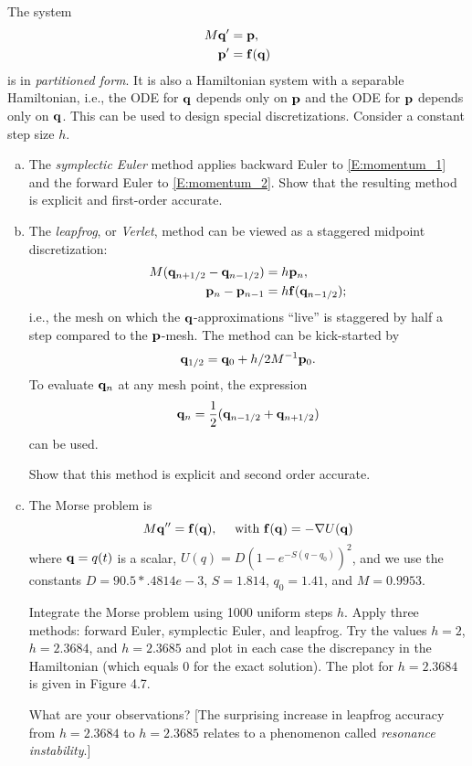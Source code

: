 \begin{problem}[A\&P 4.11]
  The system
  \begin{subequations}
    \begin{align}
      \label{E:momentum_1}
      M \mathbf{q}' &= \mathbf{p}, \\
      \label{E:momentum_2}
      \mathbf{p}' &= \mathbf{f}(\mathbf{q})
    \end{align}
  \end{subequations}
  is in \emph{partitioned form}. It is also a Hamiltonian system with a separable Hamiltonian, i.e., the ODE for $\mathbf{q}$ depends only on $\mathbf{p}$ and the ODE for $\mathbf{p}$ depends only on $\mathbf{q}$. This can be used to design special discretizations. Consider a constant step size $h$.
  \begin{enumerate}[(a)]
    \item The \emph{symplectic Euler} method applies backward Euler to \eqref{E:momentum_1} and the forward Euler to \eqref{E:momentum_2}. Show that the resulting method is explicit and first-order accurate.
    \item The \emph{leapfrog}, or \emph{Verlet}, method can be viewed as a staggered midpoint discretization:
    \begin{align*}
      M(\mathbf{q}_{n+1/2} - \mathbf{q}_{n-1/2}) &= h \mathbf{p}_n, \\
      \mathbf{p}_n - \mathbf{p}_{n-1} &= h \mathbf{f}(\mathbf{q}_{n-1/2});
    \end{align*}
    i.e., the mesh on which the $\mathbf{q}$-approximations ``live'' is staggered by half a step compared to the $\mathbf{p}$-mesh. The method can be kick-started by
    \[
      \mathbf{q}_{1/2} = \mathbf{q}_0 + h/2 M^{-1}\mathbf{p}_0.
    \]
    To evaluate $\mathbf{q}_n$ at any mesh point, the expression
    \[
      \mathbf{q}_n = \frac12 (\mathbf{q}_{n-1/2} + \mathbf{q}_{n+1/2})
    \]
    can be used.
    
    Show that this method is explicit and second order accurate.
    \item The Morse problem is 
    \[
      M \mathbf{q}'' = \mathbf{f}(\mathbf{q}), \quad \text{ with } \mathbf{f}(\mathbf{q}) = -\mathbf{\nabla} U(\mathbf{q})
    \]
    where $\mathbf{q} = q(t)$ is a scalar, $U(q) = D(1 - e^{-S(q-q_0)})^2$, and we use the constants $D = 90.5*.4814e-3$, $S = 1.814$, $q_0 = 1.41$, and $M = 0.9953$.
    
    Integrate the Morse problem using 1000 uniform steps $h$. Apply three methods: forward Euler, symplectic Euler, and leapfrog. Try the values $h = 2$, $h = 2.3684$, and $h = 2.3685$ and plot in each case the discrepancy in the Hamiltonian (which equals 0 for the exact solution). The plot for $h = 2.3684$ is given in Figure 4.7.
    
    What are your observations? [The surprising increase in leapfrog accuracy from $h = 2.3684$ to $h = 2.3685$ relates to a phenomenon called \emph{resonance instability}.]
  \end{enumerate}
\end{problem}

\FloatBarrier

\begin{solution}
  
\end{solution}
